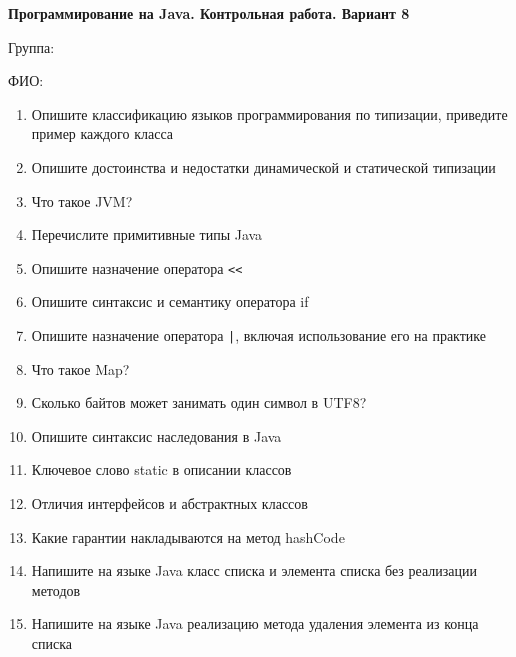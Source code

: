 \documentclass[12pt]{article}
\begin{document}
\newpage\begin{minipage}{\textwidth}
\textbf{Программирование на Java. Контрольная работа. Вариант 8}

Группа: \underline{\hspace{3cm}}

ФИО: \underline{\hspace{10cm}}

\begin{enumerate}
\item Опишите классификацию языков программирования по типизации, приведите пример каждого класса
\item Опишите достоинства и недостатки динамической и статической типизации
\item Что такое JVM?
\item Перечислите примитивные типы Java
\item Опишите назначение оператора \verb|<<|
\item Опишите синтаксис и семантику оператора if
\item Опишите назначение оператора \verb!|!, включая использование его на практике
\item Что такое Map?
\item Сколько байтов может занимать один символ в UTF8?
\item Опишите синтаксис наследования в Java
\item Ключевое слово static в описании классов
\item Отличия интерфейсов и абстрактных классов
\item Какие гарантии накладываются на метод hashCode
\item Напишите на языке Java класс списка и элемента списка без реализации методов
\item Напишите на языке Java реализацию метода удаления элемента из конца списка

\end{enumerate}
\end{minipage}
\end{document}
